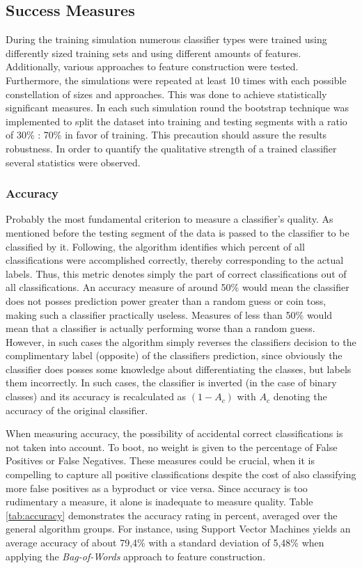 			
	\subsection{Success Measures}
		\label{accuracy}
		During the training simulation numerous classifier types were trained using differently sized training sets and using different amounts of features. Additionally, various approaches to feature construction were tested. Furthermore, the simulations were repeated at least 10 times with each possible constellation of sizes and approaches. This was done to achieve statistically significant measures. In each such simulation round the bootstrap technique was implemented to split the dataset into training and testing segments with a ratio of 30\% : 70\% in favor of training. This precaution should assure the results robustness. In order to quantify the qualitative strength of a trained classifier several statistics were observed.
		
		\par
	
		\subsubsection{Accuracy}
			Probably the most fundamental criterion to measure a classifier's quality. As mentioned before the testing segment of the data is passed to the classifier to be classified by it. Following, the algorithm identifies which percent of all classifications were accomplished correctly, thereby corresponding to the actual labels. Thus, this metric denotes simply the part of correct classifications out of all classifications. An accuracy measure of around 50\% would mean the classifier does not posses prediction power greater than a random guess or coin toss, making such a classifier practically useless. Measures of less than 50\% would mean that a classifier is actually performing worse than a random guess. However, in such cases the algorithm simply reverses the classifiers decision to the complimentary label (opposite) of the classifiers prediction, since obviously the classifier does posses some knowledge about differentiating the classes, but labels them incorrectly. In such cases, the classifier is inverted (in the case of binary classes) and its accuracy is recalculated as $ (1-A_c) $ with $ A_c $ denoting the accuracy of the original classifier. 
			
			\par
			When measuring accuracy, the possibility of accidental correct classifications is not taken into account. To boot, no weight is given to the percentage of False Positives or False Negatives. These measures could be crucial, when it is compelling to capture all positive classifications despite the cost of also classifying more false positives as a byproduct or vice versa. Since accuracy is too rudimentary a measure, it alone is inadequate to measure quality. Table \ref{tab:accuracy} demonstrates the accuracy rating in percent, averaged over the general algorithm groups. For instance, using Support Vector Machines yields an average accuracy of about 79,4\% with a standard deviation of 5,48\% when applying the \textit{Bag-of-Words} approach to feature construction.
			
